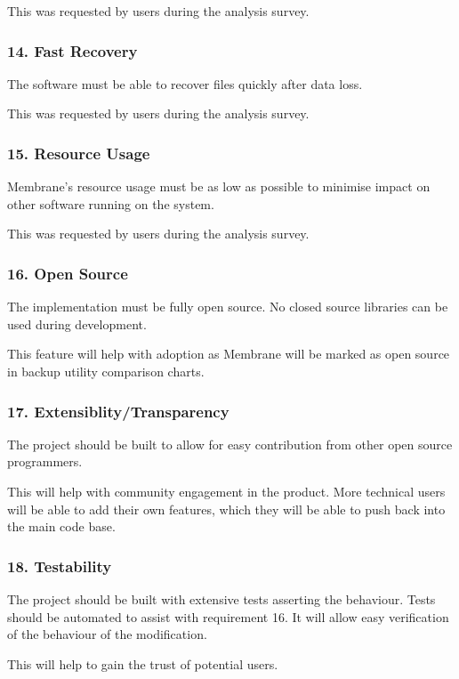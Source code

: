 \documentclass[11pt, a4paper, twocolumn, twoside]{report}
\begin{document}
This was requested by users during the analysis survey.

\subsubsection{14. Fast Recovery}
The software must be able to recover files quickly after data loss.

This was requested by users during the analysis survey.

\subsubsection{15. Resource Usage}
Membrane's resource usage must be as low as possible to minimise impact on other software running on the system.

This was requested by users during the analysis survey.

\subsubsection{16. Open Source}

The implementation must be fully open source. No closed source libraries can be used during development.

This feature will help with adoption as Membrane will be marked as open source in backup utility comparison charts.

\subsubsection{17. Extensiblity/Transparency}

The project should be built to allow for easy contribution from other open source programmers.

This will help with community engagement in the product. More technical users will be able to add their own features, which they will be able to push back into the main code base.

\subsubsection{18. Testability}

The project should be built with extensive tests asserting the behaviour. Tests should be automated to assist with requirement 16. It will allow easy verification of the behaviour of the modification.

This will help to gain the trust of potential users.
\end{document}
